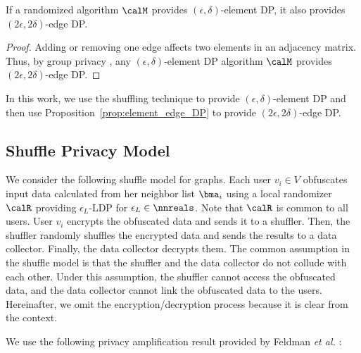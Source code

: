 \begin{proposition}\label{prop:element_edge_DP}
If a randomized algorithm $\calM$ provides $(\epsilon, \delta)$-element DP, it also provides $(2\epsilon, 2\delta)$-edge DP. 
\end{proposition}
\begin{proof}
Adding or removing one edge affects two elements in an adjacency matrix. 
Thus, by group privacy \cite{DP}, any 
$(\epsilon, \delta)$-element DP 
algorithm $\calM$ 
provides $(2\epsilon, 2\delta)$-edge DP. 
\end{proof}

In this work, we use the shuffling technique to provide $(\epsilon, \delta)$-element DP and then use Proposition~\ref{prop:element_edge_DP} to provide $(2\epsilon, 2\delta)$-edge DP. 

\subsection{Shuffle Privacy Model}
\label{sub:shuffle}
We consider the following shuffle model for graphs. 
Each user $v_i \in V$ obfuscates 
input data calculated from her neighbor list $\bma_i$ 
using a local randomizer $\calR$ providing $\epsilon_L$-LDP for $\epsilon_L \in \nnreals$. 
Note that $\calR$ is common to all users. 
User $v_i$ encrypts the obfuscated data and sends it to a shuffler. 
Then, the shuffler randomly shuffles the encrypted data and sends the results to a data collector. 
Finally, the data collector decrypts them. 
The common assumption in the shuffle model is that the shuffler and the data collector do not collude with each other. 
Under this assumption, the shuffler cannot access the obfuscated data, and the data collector cannot link the obfuscated data to the users. 
Hereinafter, we omit the encryption/decryption process because it is clear from the context. 

We use the following privacy amplification result provided by Feldman \textit{et al.} \cite{Feldman_FOCS21}:

